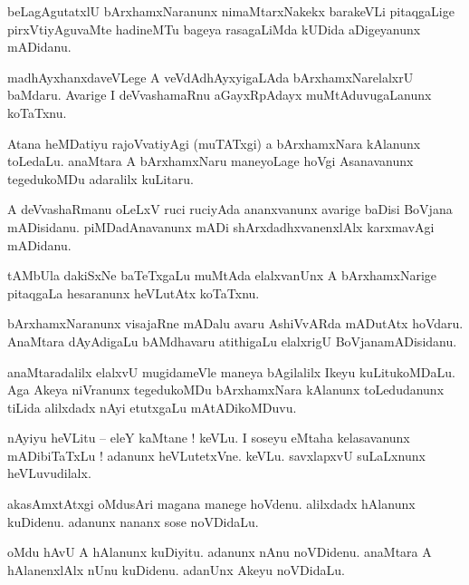 \documentclass{article}
\begin{document}
\begin{mn}%
beLagAgutatxlU bArxhamxNaranunx nimaMtarxNakekx barakeVLi pitaqgaLige pirxVtiyAguvaMte hadineMTu 
bageya rasagaLiMda kUDida aDigeyanunx mADidanu.
\end{mn}

\begin{mn}%
madhAyxhanxdaveVLege A veVdAdhAyxyigaLAda bArxhamxNarelalxrU baMdaru. Avarige I deVvashamaRnu 
aGayxRpAdayx muMtAduvugaLanunx koTaTxnu.
\end{mn}

\begin{mn}%
Atana heMDatiyu rajoVvatiyAgi (muTATxgi) a bArxhamxNara kAlanunx toLedaLu. anaMtara A bArxhamxNaru 
maneyoLage hoVgi Asanavanunx tegedukoMDu adaralilx kuLitaru.
\end{mn}

\begin{mn}%
A deVvashaRmanu oLeLxV ruci ruciyAda ananxvanunx avarige baDisi BoVjana mADisidanu. piMDadAnavanunx 
mADi shArxdadhxvanenxlAlx karxmavAgi mADidanu.
\end{mn}

\begin{mn}%
tAMbUla dakiSxNe baTeTxgaLu muMtAda elalxvanUnx A bArxhamxNarige pitaqgaLa hesaranunx heVLutAtx 
koTaTxnu.
\end{mn}

\begin{mn}%
bArxhamxNaranunx visajaRne mADalu avaru AshiVvARda mADutAtx hoVdaru. AnaMtara dAyAdigaLu bAMdhavaru 
atithigaLu elalxrigU BoVjanamADisidanu.
\end{mn}

\begin{mn}%
anaMtaradalilx elalxvU mugidameVle maneya bAgilalilx Ikeyu kuLitukoMDaLu. Aga Akeya niVranunx 
tegedukoMDu bArxhamxNara kAlanunx toLedudanunx tiLida alilxdadx nAyi etutxgaLu mAtADikoMDuvu.
\end{mn}

\begin{mn}%
nAyiyu heVLitu -- eleY kaMtane ! keVLu. I soseyu eMtaha kelasavanunx mADibiTaTxLu ! adanunx 
heVLutetxVne. keVLu. savxlapxvU suLaLxnunx heVLuvudilalx.
\end{mn}

\begin{mn}%
akasAmxtAtxgi oMdusAri magana manege hoVdenu. alilxdadx hAlanunx kuDidenu. adanunx nananx sose 
noVDidaLu.
\end{mn}

\begin{mn}%
oMdu hAvU A hAlanunx kuDiyitu. adanunx nAnu noVDidenu. anaMtara A hAlanenxlAlx nUnu kuDidenu. 
adanUnx Akeyu noVDidaLu.
\end{mn}
\end{document}
